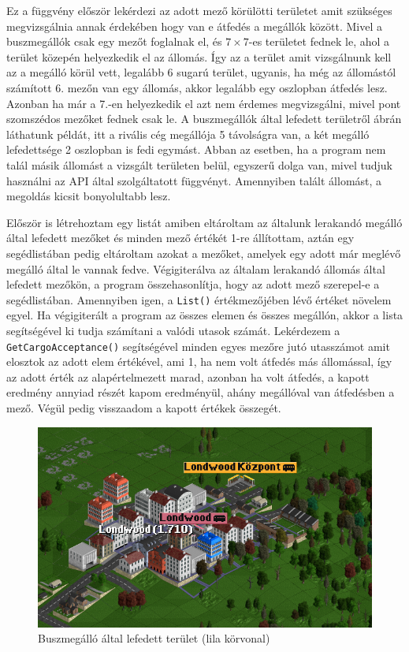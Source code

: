 Ez a függvény először lekérdezi az adott mező körülötti területet amit szükséges megvizsgálnia annak érdekében hogy van e átfedés a megállók között. Mivel a buszmegállók csak egy mezőt foglalnak el, és $7 \times 7$-es területet fednek le, ahol a terület közepén helyezkedik el az állomás. Így az a terület amit vizsgálnunk kell az a megálló körül vett, legalább 6 sugarú terület, ugyanis, ha még az állomástól számított 6. mezőn van egy állomás, akkor legalább egy oszlopban átfedés lesz. Azonban ha már a 7.-en helyezkedik el azt nem érdemes megvizsgálni, mivel pont szomszédos mezőket fednek csak le. A buszmegállók által lefedett területről  ábrán láthatunk példát, itt a rivális cég megállója 5 távolságra van, a két megálló lefedettsége 2 oszlopban is fedi egymást. Abban az esetben, ha a program nem talál másik állomást a vizsgált területen belül, egyszerű dolga van, mivel tudjuk használni az API által szolgáltatott függvényt. Amennyiben talált állomást, a megoldás kicsit bonyolultabb lesz.

Először is létrehoztam egy listát amiben eltároltam az általunk lerakandó megálló által lefedett mezőket és minden mező értékét 1-re állítottam, aztán egy segédlistában pedig eltároltam azokat a mezőket, amelyek egy adott már meglévő megálló által le vannak fedve. Végigiterálva az általam lerakandó állomás által lefedett mezőkön, a program összehasonlítja, hogy az adott mező szerepel-e a segédlistában. Amennyiben igen, a \texttt{List()} értékmezőjében lévő értéket növelem egyel. Ha végigiterált a program az összes elemen és összes megállón, akkor a lista segítségével ki tudja számítani a valódi utasok számát. Lekérdezem a \texttt{GetCargoAcceptance()} segítségével minden egyes mezőre jutó utasszámot amit elosztok az adott elem értékével, ami 1, ha nem volt átfedés más állomással, így az adott érték az alapértelmezett marad, azonban ha volt átfedés, a kapott eredmény annyiad részét kapom eredményül, ahány megállóval van átfedésben a mező. Végül pedig visszaadom a kapott értékek összegét.

\begin{figure} [b!]
	\centering
	\includegraphics[width=\textwidth]{images/megallo.png}
	\caption{Buszmegálló által lefedett terület (lila körvonal)}
	\label{fig:megallo}
\end{figure}

